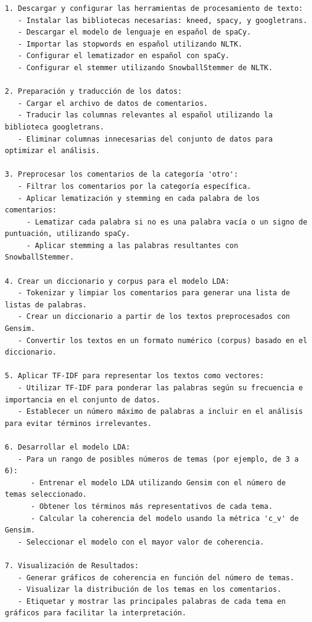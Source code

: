 \documentclass{matematicasud}
\begin{document}
\begin{verbatim}
1. Descargar y configurar las herramientas de procesamiento de texto:
   - Instalar las bibliotecas necesarias: kneed, spacy, y googletrans.
   - Descargar el modelo de lenguaje en español de spaCy.
   - Importar las stopwords en español utilizando NLTK.
   - Configurar el lematizador en español con spaCy.
   - Configurar el stemmer utilizando SnowballStemmer de NLTK.

2. Preparación y traducción de los datos:
   - Cargar el archivo de datos de comentarios.
   - Traducir las columnas relevantes al español utilizando la biblioteca googletrans.
   - Eliminar columnas innecesarias del conjunto de datos para optimizar el análisis.

3. Preprocesar los comentarios de la categoría 'otro':
   - Filtrar los comentarios por la categoría específica.
   - Aplicar lematización y stemming en cada palabra de los comentarios:
     - Lematizar cada palabra si no es una palabra vacía o un signo de puntuación, utilizando spaCy.
     - Aplicar stemming a las palabras resultantes con SnowballStemmer.

4. Crear un diccionario y corpus para el modelo LDA:
   - Tokenizar y limpiar los comentarios para generar una lista de listas de palabras.
   - Crear un diccionario a partir de los textos preprocesados con Gensim.
   - Convertir los textos en un formato numérico (corpus) basado en el diccionario.

5. Aplicar TF-IDF para representar los textos como vectores:
   - Utilizar TF-IDF para ponderar las palabras según su frecuencia e importancia en el conjunto de datos.
   - Establecer un número máximo de palabras a incluir en el análisis para evitar términos irrelevantes.

6. Desarrollar el modelo LDA:
   - Para un rango de posibles números de temas (por ejemplo, de 3 a 6):
      - Entrenar el modelo LDA utilizando Gensim con el número de temas seleccionado.
      - Obtener los términos más representativos de cada tema.
      - Calcular la coherencia del modelo usando la métrica 'c_v' de Gensim.
   - Seleccionar el modelo con el mayor valor de coherencia.

7. Visualización de Resultados:
   - Generar gráficos de coherencia en función del número de temas.
   - Visualizar la distribución de los temas en los comentarios.
   - Etiquetar y mostrar las principales palabras de cada tema en gráficos para facilitar la interpretación.
\end{verbatim}
\end{document}
